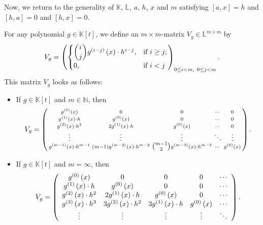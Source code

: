 \documentclass[numbers=enddot,12pt,final,onecolumn,notitlepage]{scrartcl}%
\theoremstyle{definition}
\begin{document}
Now, we return to the generality of $\mathbb{K}$, $\mathbb{L}$, $a$, $h$, $x$
and $m$ satisfying $\left[  a,x\right]  =h$ and $\left[  h,a\right]  =0$ and
$\left[  h,x\right]  =0.$

For any polynomial $g\in\mathbb{K}\left[  t\right]  $, we define an $m\times
m$-matrix $V_{g}\in\mathbb{L}^{m\times m}$ by%
\begin{equation}
V_{g}=\left(
\begin{cases}
\dbinom{i}{j}g^{\left(  i-j\right)  }\left(  x\right)  \cdot h^{i-j}, &
\text{if }i\geq j;\\
0, & \text{if }i<j
\end{cases}
\right)  _{0\leq i<m,\ 0\leq j<m}. \label{eq.Vg=}%
\end{equation}
This matrix $V_{g}$ looks as follows:

\begin{itemize}
\item If $g\in\mathbb{K}\left[  t\right]  $ and $m\in\mathbb{N}$, then%
\[
V_{g}=\left(
\begin{smallmatrix}
g^{\left(  0\right)  }\left(  x\right)  & 0 & 0 & \cdots & 0\\
g^{\left(  1\right)  }\left(  x\right)  \cdot h & g^{\left(  0\right)
}\left(  x\right)  & 0 & \cdots & 0\\
g^{\left(  2\right)  }\left(  x\right)  \cdot h^{2} & 2g^{\left(  1\right)
}\left(  x\right)  \cdot h & g^{\left(  0\right)  }\left(  x\right)  & \cdots
& 0\\
\vdots & \vdots & \vdots & \ddots & \vdots\\
g^{\left(  m-1\right)  }\left(  x\right)  \cdot h^{m-1} & \left(  m-1\right)
g^{\left(  m-2\right)  }\left(  x\right)  \cdot h^{m-2} & \tbinom{m-1}%
{2}g^{\left(  m-3\right)  }\left(  x\right)  \cdot h^{m-3} & \cdots &
g^{\left(  0\right)  }\left(  x\right)
\end{smallmatrix}
\right)  .
\]


\item If $g\in\mathbb{K}\left[  t\right]  $ and $m=\infty$, then%
\[
V_{g}=\left(
\begin{array}
[c]{ccccc}%
g^{\left(  0\right)  }\left(  x\right)  & 0 & 0 & 0 & \cdots\\
g^{\left(  1\right)  }\left(  x\right)  \cdot h & g^{\left(  0\right)
}\left(  x\right)  & 0 & 0 & \cdots\\
g^{\left(  2\right)  }\left(  x\right)  \cdot h^{2} & 2g^{\left(  1\right)
}\left(  x\right)  \cdot h & g^{\left(  0\right)  }\left(  x\right)  & 0 &
\cdots\\
g^{\left(  3\right)  }\left(  x\right)  \cdot h^{3} & 3g^{\left(  2\right)
}\left(  x\right)  \cdot h^{2} & 3g^{\left(  1\right)  }\left(  x\right)
\cdot h & g^{\left(  0\right)  }\left(  x\right)  & \cdots\\
\vdots & \vdots & \vdots & \vdots & \ddots
\end{array}
\right)  .
\]

\end{itemize}
\end{document}
